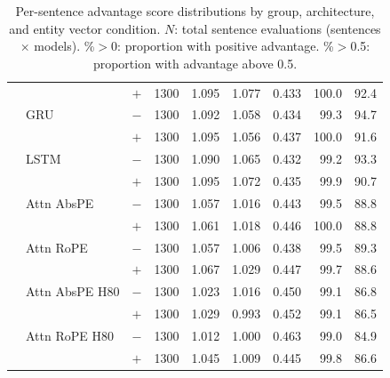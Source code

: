 \begin{table}[t]
\begin{tabular}{@{}lllrrrrrr@{}}
 &  & $+$ & 1300 & 1.095 & 1.077 & 0.433 & 100.0 & 92.4 \\
\addlinespace[1pt]
 & GRU & $-$ & 1300 & 1.092 & 1.058 & 0.434 & 99.3 & 94.7 \\
 &  & $+$ & 1300 & 1.095 & 1.056 & 0.437 & 100.0 & 91.6 \\
\addlinespace[1pt]
 & LSTM & $-$ & 1300 & 1.090 & 1.065 & 0.432 & 99.2 & 93.3 \\
 &  & $+$ & 1300 & 1.095 & 1.072 & 0.435 & 99.9 & 90.7 \\
\addlinespace[1pt]
 & Attn AbsPE & $-$ & 1300 & 1.057 & 1.016 & 0.443 & 99.5 & 88.8 \\
 &  & $+$ & 1300 & 1.061 & 1.018 & 0.446 & 100.0 & 88.8 \\
\addlinespace[1pt]
 & Attn RoPE & $-$ & 1300 & 1.057 & 1.006 & 0.438 & 99.5 & 89.3 \\
 &  & $+$ & 1300 & 1.067 & 1.029 & 0.447 & 99.7 & 88.6 \\
\addlinespace[1pt]
 & Attn AbsPE H80 & $-$ & 1300 & 1.023 & 1.016 & 0.450 & 99.1 & 86.8 \\
 &  & $+$ & 1300 & 1.029 & 0.993 & 0.452 & 99.1 & 86.5 \\
\addlinespace[1pt]
 & Attn RoPE H80 & $-$ & 1300 & 1.012 & 1.000 & 0.463 & 99.0 & 84.9 \\
 &  & $+$ & 1300 & 1.045 & 1.009 & 0.445 & 99.8 & 86.6 \\
\bottomrule
\end{tabular}
\caption{Per-sentence advantage score distributions by group, architecture, and entity vector condition. $N$: total sentence evaluations (sentences $\times$ models). \%${>}$0: proportion with positive advantage. \%${>}$0.5: proportion with advantage above 0.5.}
\label{tab:advantage_distributions_train}
\end{table}

